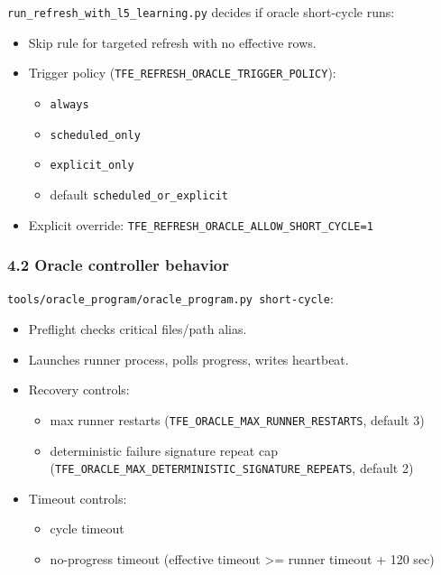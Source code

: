 \documentclass[
]{article}
\providecommand{\tightlist}{%
  \setlength{\itemsep}{0pt}\setlength{\parskip}{0pt}}
\begin{document}
\texttt{run\_refresh\_with\_l5\_learning.py} decides if oracle
short-cycle runs:

\begin{itemize}
\tightlist
\item
  Skip rule for targeted refresh with no effective rows.
\item
  Trigger policy (\texttt{TFE\_REFRESH\_ORACLE\_TRIGGER\_POLICY}):

  \begin{itemize}
  \tightlist
  \item
    \texttt{always}
  \item
    \texttt{scheduled\_only}
  \item
    \texttt{explicit\_only}
  \item
    default \texttt{scheduled\_or\_explicit}
  \end{itemize}
\item
  Explicit override:
  \texttt{TFE\_REFRESH\_ORACLE\_ALLOW\_SHORT\_CYCLE=1}
\end{itemize}

\subsubsection{4.2 Oracle controller
behavior}\label{42-oracle-controller-behavior}

\texttt{tools/oracle\_program/oracle\_program.py\ short-cycle}:

\begin{itemize}
\tightlist
\item
  Preflight checks critical files/path alias.
\item
  Launches runner process, polls progress, writes heartbeat.
\item
  Recovery controls:

  \begin{itemize}
  \tightlist
  \item
    max runner restarts (\texttt{TFE\_ORACLE\_MAX\_RUNNER\_RESTARTS},
    default 3)
  \item
    deterministic failure signature repeat cap
    (\texttt{TFE\_ORACLE\_MAX\_DETERMINISTIC\_SIGNATURE\_REPEATS},
    default 2)
  \end{itemize}
\item
  Timeout controls:

  \begin{itemize}
  \tightlist
  \item
    cycle timeout
  \item
    no-progress timeout (effective timeout \textgreater= runner timeout
    + 120 sec)
  \end{itemize}
\end{itemize}
\end{document}
